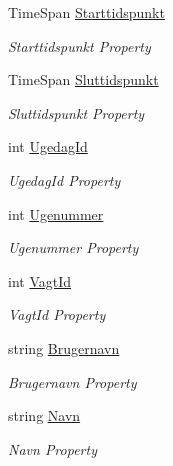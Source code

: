 \begin{DoxyCompactItemize}
\item 
Time\+Span \hyperlink{class__1aarsproeve_1_1_model_1_1_vagtplan_view_a2a9289ab85eb5b6cd7691a8c99f4db31}{Starttidspunkt}
\begin{DoxyCompactList}\small\item\em Starttidspunkt Property \end{DoxyCompactList}\item 
Time\+Span \hyperlink{class__1aarsproeve_1_1_model_1_1_vagtplan_view_a857981f9a44c61a751580ec5d6e72c7c}{Sluttidspunkt}
\begin{DoxyCompactList}\small\item\em Sluttidspunkt Property \end{DoxyCompactList}\item 
int \hyperlink{class__1aarsproeve_1_1_model_1_1_vagtplan_view_a4dc9d626f9b0c5d6c20b15eb9ee5f25e}{Ugedag\+Id}
\begin{DoxyCompactList}\small\item\em Ugedag\+Id Property \end{DoxyCompactList}\item 
int \hyperlink{class__1aarsproeve_1_1_model_1_1_vagtplan_view_a9d1c876dc939eafea04ad170a049df8b}{Ugenummer}
\begin{DoxyCompactList}\small\item\em Ugenummer Property \end{DoxyCompactList}\item 
int \hyperlink{class__1aarsproeve_1_1_model_1_1_vagtplan_view_a2255fed674c028434296baa136be598e}{Vagt\+Id}
\begin{DoxyCompactList}\small\item\em Vagt\+Id Property \end{DoxyCompactList}\item 
string \hyperlink{class__1aarsproeve_1_1_model_1_1_vagtplan_view_af46a732717fd9170a86a110b8fc5c5d3}{Brugernavn}
\begin{DoxyCompactList}\small\item\em Brugernavn Property \end{DoxyCompactList}\item 
string \hyperlink{class__1aarsproeve_1_1_model_1_1_vagtplan_view_a3a99e8660e89591f8134cab170c73cb5}{Navn}
\begin{DoxyCompactList}\small\item\em Navn Property \end{DoxyCompactList}\end{DoxyCompactItemize}


